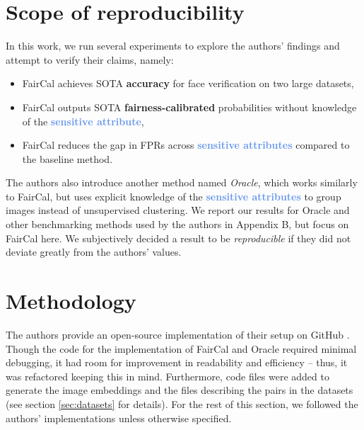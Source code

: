 \section{Scope of reproducibility}
\label{sec:claims}
In this work, we run several experiments to explore the authors' findings and attempt to verify their claims, namely:
\begin{itemize}
    \item FairCal achieves SOTA \textcolor{Emerald}{\textbf{accuracy}} for face verification on two large datasets,
    \item FairCal outputs SOTA \textcolor{Bittersweet}{\textbf{fairness-calibrated}} probabilities without knowledge of the \textcolor{CornflowerBlue}{\textbf{sensitive attribute}},
    \item FairCal reduces the gap in FPRs across \textcolor{CornflowerBlue}{\textbf{sensitive attributes}} compared to the baseline method.
\end{itemize}
The authors also introduce another method named \textit{Oracle}, which works similarly to FairCal, but uses explicit knowledge of the \textcolor{CornflowerBlue}{\textbf{sensitive attributes}} to group images instead of unsupervised clustering. We report our results for Oracle and other benchmarking methods used by the authors in Appendix B, but focus on FairCal here. We subjectively decided a result to be \textit{reproducible} if they did not deviate greatly from the authors' values.


\section{Methodology}
The authors provide an open-source implementation of their setup on GitHub \citep{faircalgithub}. 
Though the code for the implementation of FairCal and Oracle required minimal debugging, it had room for improvement in readability and efficiency -- thus, it was refactored keeping this in mind. Furthermore, code files were added to generate the image embeddings and the files describing the pairs in the datasets (see section \ref{sec:datasets} for details). For the rest of this section, we followed the authors' implementations unless otherwise specified.

